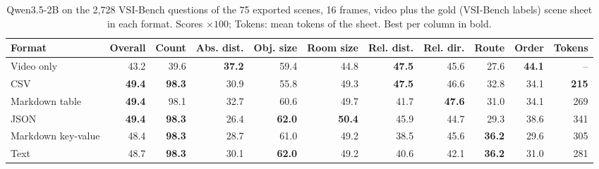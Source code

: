 \begin{table}[t]
\centering
\small
\begin{tabular}{lrrrrrrrrrr}
\toprule
Format & Overall & Count & Abs. dist. & Obj. size & Room size & Rel. dist. & Rel. dir. & Route & Order & Tokens \\
\midrule
Video only & 43.2 & 39.6 & \textbf{37.2} & 59.4 & 44.8 & \textbf{47.5} & 45.6 & 27.6 & \textbf{44.1} & -- \\
\midrule
CSV & \textbf{49.4} & \textbf{98.3} & 30.9 & 55.8 & 49.3 & \textbf{47.5} & 46.6 & 32.8 & 34.1 & \textbf{215} \\
Markdown table & \textbf{49.4} & 98.1 & 32.7 & 60.6 & 49.7 & 41.7 & \textbf{47.6} & 31.0 & 34.1 & 269 \\
JSON & \textbf{49.4} & \textbf{98.3} & 26.4 & \textbf{62.0} & \textbf{50.4} & 45.9 & 44.7 & 29.3 & 38.6 & 341 \\
Markdown key-value & 48.4 & \textbf{98.3} & 28.7 & 61.0 & 49.2 & 38.5 & 45.6 & \textbf{36.2} & 29.6 & 305 \\
Text & 48.7 & \textbf{98.3} & 30.1 & \textbf{62.0} & 49.2 & 40.6 & 42.1 & \textbf{36.2} & 31.0 & 281 \\
\bottomrule
\end{tabular}
\caption{Qwen3.5-2B on the 2{,}728 VSI-Bench questions of the 75 exported scenes, 16 frames, video plus the gold (VSI-Bench labels) scene sheet in each format. Scores $\times 100$; Tokens: mean tokens of the sheet. Best per column in bold.}
\label{tab:sheet-format-gold}
\end{table}

